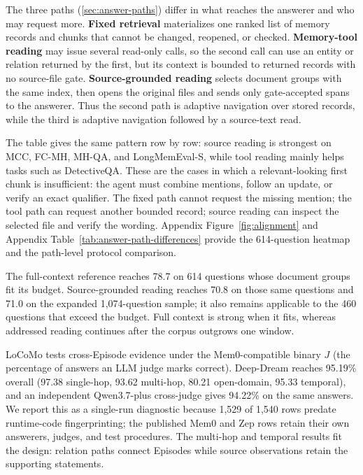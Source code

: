 The three paths (\cref{sec:answer-paths}) differ in what reaches the answerer and who may request more. \textbf{Fixed retrieval} materializes one ranked list of memory records and chunks that cannot be changed, reopened, or checked. \textbf{Memory-tool reading} may issue several read-only calls, so the second call can use an entity or relation returned by the first, but its context is bounded to returned records with no source-file gate. \textbf{Source-grounded reading} selects document groups with the same index, then opens the original files and sends only gate-accepted spans to the answerer. Thus the second path is adaptive navigation over stored records, while the third is adaptive navigation followed by a source-text read.

The table gives the same pattern row by row: source reading is strongest on MCC, FC-MH, MH-QA, and LongMemEval-S, while tool reading mainly helps tasks such as DetectiveQA. These are the cases in which a relevant-looking first chunk is insufficient: the agent must combine mentions, follow an update, or verify an exact qualifier. The fixed path cannot request the missing mention; the tool path can request another bounded record; source reading can inspect the selected file and verify the wording. Appendix Figure~\ref{fig:alignment} and Appendix Table~\ref{tab:answer-path-differences} provide the 614-question heatmap and the path-level protocol comparison.

The full-context reference reaches 78.7 on 614 questions whose document groups fit its budget. Source-grounded reading reaches 70.8 on those same questions and 71.0 on the expanded 1,074-question sample; it also remains applicable to the 460 questions that exceed the budget. Full context is strong when it fits, whereas addressed reading continues after the corpus outgrows one window.

LoCoMo tests cross-Episode evidence under the Mem0-compatible binary $J$ (the percentage of answers an LLM judge marks correct). Deep-Dream reaches 95.19\% overall (97.38 single-hop, 93.62 multi-hop, 80.21 open-domain, 95.33 temporal), and an independent Qwen3.7-plus cross-judge gives 94.22\% on the same answers. We report this as a single-run diagnostic because 1,529 of 1,540 rows predate runtime-code fingerprinting; the published Mem0 and Zep rows retain their own answerers, judges, and test procedures. The multi-hop and temporal results fit the design: relation paths connect Episodes while source observations retain the supporting statements.

